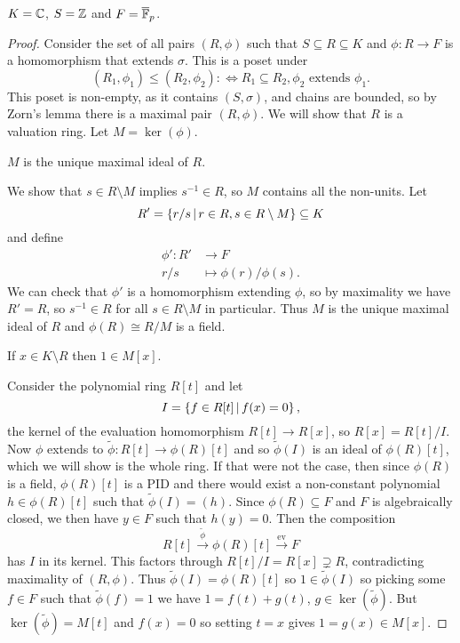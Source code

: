 \begin{example}
    $K = \mathbb{C}$, $S = \mathbb{Z}$ and $F = \overline{\mathbb{F}}_p$.
\end{example}

\begin{proof}
    Consider the set of all pairs $(R, \phi)$ such that $S \subseteq R \subseteq K$ and $\phi \colon R \to F$ is a homomorphism that extends $\sigma$.
    This is a poset under \[
        (R_1, \phi_1) \leq (R_2, \phi_2) :\Leftrightarrow R_1 \subseteq R_2, \phi_2 \text{ extends } \phi_1.
    \]
    This poset is non-empty, as it contains $(S, \sigma)$, and chains are bounded, so by Zorn's lemma there is a maximal pair $(R, \phi)$.
    We will show that $R$ is a valuation ring.
    Let $M = \ker (\phi)$.
    \begin{claim}
        $M$ is the unique maximal ideal of $R$.
    \end{claim}
    We show that $s \in R \setminus M$ implies $s^{-1} \in R$, so $M$ contains all the non-units.
    Let \[
        R' = \left\{ r / s \,\middle|\,  r \in R, s \in R \setminus M  \right\} \subseteq K
    \] and define
    \begin{align*}
        \phi' \colon R' &\to F \\
                    r/s &\mapsto \phi(r) / \phi(s).
    \end{align*}
    We can check that $\phi'$ is a homomorphism extending $\phi$, so by maximality we have $R' = R$, so $s^{-1} \in R$ for all $s \in R \setminus M$ in particular.
    Thus $M$ is the unique maximal ideal of $R$ and $\phi(R) \cong R / M$ is a field.

    \begin{claim}
        If $x \in K \setminus R$ then $1 \in M[x]$.
    \end{claim}
    Consider the polynomial ring $R[t]$ and let \[
        I = \left\{ f \in R[t] \,\middle|\, f(x) = 0 \right\},
    \] the kernel of the evaluation homomorphism $R[t] \to R[x]$, so $R[x] = R[t] / I$.
    Now $\phi$ extends to $\tilde{\phi} \colon R[t] \to \phi(R)[t]$ and so $\tilde{\phi}(I)$ is an ideal of $\phi(R)[t]$, which we will show is the whole ring.
    If that were not the case, then since $\phi(R)$ is a field, $\phi(R)[t]$ is a PID and there would exist a non-constant polynomial $h \in \phi(R)[t]$ such that $\tilde{\phi}(I) = (h)$.
    Since $\phi(R) \subseteq F$ and $F$ is algebraically closed, we then have $y \in F$ such that $h(y) = 0$.
    Then the composition \[
        R[t] \overset{\tilde{\phi}}{\to} \phi(R)[t] \overset{\text{ev}}{\to} F
    \] has $I$ in its kernel.
    This factors through $R[t] / I = R[x] \supsetneq R$, contradicting maximality of $(R, \phi)$.
    Thus $\tilde{\phi}(I) = \phi(R)[t]$ so $1 \in \tilde{\phi}(I)$ so picking some $f \in F$ such that $\tilde{\phi}(f) = 1$ we have $1 = f(t) + g(t)$, $g \in \ker(\tilde{\phi})$.
    But $\ker(\tilde{\phi}) = M[t]$ and $f(x) = 0$ so setting $t = x$ gives $1 = g(x) \in M[x]$.


\end{proof}
